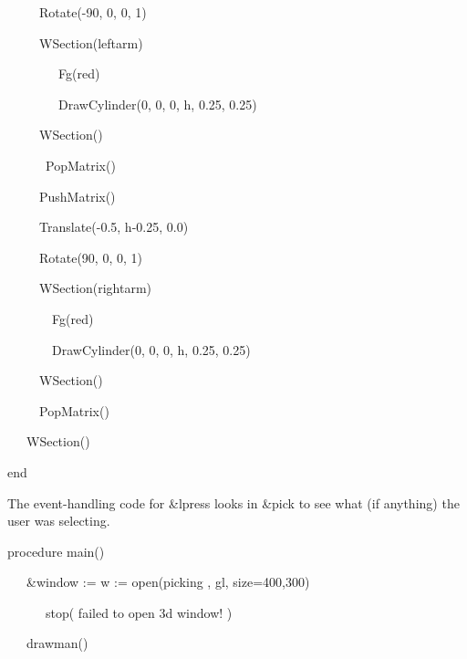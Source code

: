 \documentclass[letterpaper]{article}
\begin{document}
{{\sffamily
\ \ \ \ \  Rotate(-90, 0, 0, 1)}

{\sffamily
\ \ \ \ \  WSection({\textquotedbl}leftarm{\textquotedbl})}

{\sffamily
\ \ \ \ \  \ \ \ Fg({\textquotedbl}red{\textquotedbl})}

{\sffamily
\ \ \ \ \  \ \ \ DrawCylinder(0, 0, 0, h, 0.25, 0.25)}

{\sffamily
\ \ \ \ \  WSection()}

{\sffamily
\ \ \ \ \ \ PopMatrix()}

{\sffamily
\ \ \ \ \ PushMatrix()}

{\sffamily
\ \ \ \ \ Translate(-0.5, h-0.25, 0.0)}

{\sffamily
\ \ \ \ \ Rotate(90, 0, 0, 1)}

{\sffamily
\ \ \ \ \ WSection({\textquotedbl}rightarm{\textquotedbl})}

{\sffamily
\ \ \ \ \  \ \ Fg({\textquotedbl}red{\textquotedbl})}

{\sffamily
\ \ \ \ \  \ \ DrawCylinder(0, 0, 0, h, 0.25, 0.25)}

{\sffamily
\ \ \ \ \ WSection()}

{\sffamily
\ \ \ \ \ PopMatrix()}

{\sffamily
\ \ \ WSection()}

{\sffamily
end}


\bigskip

{
The event-handling code for \textsf{\&lpress} looks in \textsf{\&pick} to see what (if anything) the user was
selecting.}


\bigskip

{\sffamily
procedure main()}

{\sffamily
\ \ \ \&window := w := open({\textquotedbl}picking{\textquotedbl} , {\textquotedbl}gl{\textquotedbl},
{\textquotedbl}size=400,300{\textquotedbl}) {\textbar}}

{\sffamily
\ \ \ \ \ \ stop({\textquotedbl} failed to open 3d window! {\textquotedbl})}

{\sffamily
\ \ \ drawman()}

}
\end{document}
